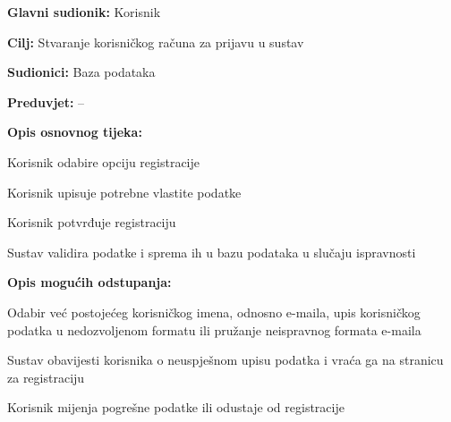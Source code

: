 					\noindent {}
					\begin{packed_item}
	
						\item \textbf{Glavni sudionik: } Korisnik
						\item  \textbf{Cilj:} Stvaranje korisničkog računa za prijavu u sustav
						\item  \textbf{Sudionici:} Baza podataka
						\item  \textbf{Preduvjet:} --
						\item  \textbf{Opis osnovnog tijeka:}
						
						\item[] \begin{packed_enum}
	
							\item Korisnik odabire opciju registracije
							\item Korisnik upisuje potrebne vlastite podatke
							\item Korisnik potvrđuje registraciju
							\item Sustav validira podatke i sprema ih u bazu podataka u slučaju ispravnosti 
							
						\end{packed_enum}
						
						\item  \textbf{Opis mogućih odstupanja:}
						
						\item[] \begin{packed_item}
	
							\item[2.a] Odabir već postojećeg korisničkog imena, odnosno e-maila, upis korisničkog podatka u nedozvoljenom formatu ili pružanje neispravnog formata e-maila
							\item[] \begin{packed_enum}
								
								\item Sustav obavijesti korisnika o neuspješnom upisu podatka i vraća ga na stranicu za registraciju
								\item Korisnik mijenja pogrešne podatke ili odustaje od registracije
								
							\end{packed_enum}
							
						\end{packed_item}
					\end{packed_item}
					
